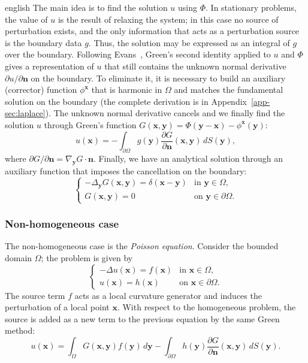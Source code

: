 \documentclass[11pt,letterpaper,twoside,openright]{book} %
\begin{document}
\begin{hyphenrules}{english}
The main idea is to find the solution $u$ using $\Phi$. In stationary problems, the value of $u$ is the
result of relaxing the system; in this case no source of perturbation exists, and the only information
that acts as a perturbation source is the boundary data $g$. Thus, the solution may be expressed as an
integral of $g$ over the boundary. Following Evans~\cite{evans2010}, Green's second identity applied to
$u$ and $\Phi$ gives a representation of $u$ that still contains the unknown normal derivative
$\partial u/\partial\mathbf{n}$ on the boundary. To eliminate it, it is necessary to build an auxiliary
(corrector) function $\phi^{\mathbf{x}}$ that is harmonic in $\Omega$ and matches the fundamental solution on
the boundary (the complete derivation is in Appendix~\ref{app-sec:laplace}). The unknown normal derivative
cancels and we finally find the solution $u$ through Green's function
$G(\mathbf{x},\mathbf{y})=\Phi(\mathbf{y}-\mathbf{x})-\phi^{\mathbf{x}}(\mathbf{y})$:
\begin{equation}
  u(\mathbf{x})=-\int_{\partial\Omega}g(\mathbf{y})\frac{\partial G}{\partial\mathbf{n}}(\mathbf{x},\mathbf{y})\,d S(\mathbf{y}),
  \label{eq:laplace-green}
\end{equation}
where $\partial G/\partial\mathbf{n}=\nabla_{\mathbf{y}}G\cdot\mathbf{n}$. Finally, we have an analytical solution through an
auxiliary function that imposes the cancellation on the boundary:
\begin{equation}
  \begin{cases}
    -\Delta_{\mathbf{y}}G(\mathbf{x},\mathbf{y})=\delta(\mathbf{x}-\mathbf{y}) & \text{in } \mathbf{y}\in\Omega,\\
    G(\mathbf{x},\mathbf{y})=0 & \text{on } \mathbf{y}\in\partial\Omega.
  \end{cases}
  \label{eq:green-function}
\end{equation}

\subsubsection{Non-homogeneous case}
The non-homogeneous case is the \emph{Poisson equation}. Consider the bounded domain $\Omega$; the
problem is given by
\begin{equation}
  \begin{cases}
    -\Delta u(\mathbf{x})=f(\mathbf{x}) & \text{in } \mathbf{x}\in\Omega,\\
    u(\mathbf{x})=h(\mathbf{x}) & \text{on } \mathbf{x}\in\partial\Omega.
  \end{cases}
  \label{eq:poisson}
\end{equation}
The source term $f$ acts as a local curvature generator and induces the perturbation of a local point
$\mathbf{x}$. With respect to the homogeneous problem, the source is added as a new term to the previous
equation by the same Green method:
\begin{equation}
  u(\mathbf{x})=\int_\Omega G(\mathbf{x},\mathbf{y})f(\mathbf{y})\,d\mathbf{y}-\int_{\partial\Omega}h(\mathbf{y})\frac{\partial G}{\partial\mathbf{n}}(\mathbf{x},\mathbf{y})\,d S(\mathbf{y}).
  \label{eq:poisson-green}
\end{equation}


\end{hyphenrules}
\end{document}
